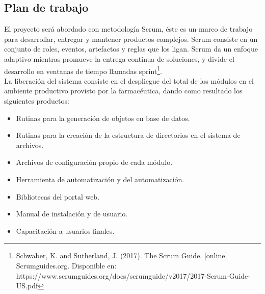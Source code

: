 \documentclass[a4paper,10pt]{article}
\begin{document}
\subsection{Plan de trabajo}
El proyecto será abordado con metodología Scrum, éste es un marco de trabajo para desarrollar, entregar y mantener productos complejos. Scrum consiste en un conjunto de roles, eventos, artefactos y reglas que los ligan. Scrum da un enfoque adaptivo mientras promueve la entrega continua de soluciones, y divide el desarrollo en ventanas de tiempo llamadas sprint\footnote{Schwaber, K. and Sutherland, J. (2017). The Scrum Guide. [online] Scrumguides.org. Disponible en: https://www.scrumguides.org/docs/scrumguide/v2017/2017-Scrum-Guide-US.pdf}.\\
La liberación del sistema consiste en el despliegue del total de los módulos en el ambiente productivo provisto por la farmacéutica,  dando como resultado los siguientes productos:
\begin{itemize}
\item Rutinas para la generación de objetos en base de datos.
\item Rutinas para la creación de la estructura de directorios en el sistema de archivos.
\item Archivos de configuración propio de cada módulo.
\item Herramienta de automatización y del automatización.
\item Bibliotecas del portal web.
\item Manual de instalación y de usuario.
\item Capacitación a usuarios finales.
\end{itemize}
\end{document}

